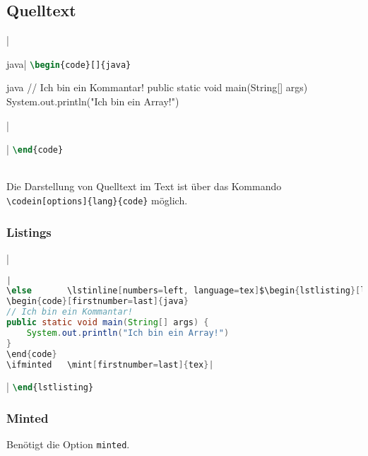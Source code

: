 \newpage
\subsection{Quelltext}
\begin{listing}
\ifminted   {}|\begin{code}[]{java}|    %
\else       \lstinline[numbers=left, language=tex]$\begin{code}[]{java}$\fi
\begin{code}[firstnumber=last]{java}
// Ich bin ein Kommantar!
public static void main(String[] args) {
    System.out.println("Ich bin ein Array!")
}
\end{code}
\ifminted   {}|\end{code}|    %
\else       \lstinline[firstnumber=last, numbers=left, language=tex]$\end{code}$\fi

\caption{Java Code}
\label{lst:java-code}
\end{listing}
~\\
Die Darstellung von Quelltext im Text ist über das Kommando \verb|\codein[options]{lang}{code}| möglich.

\subsubsection{Listings}
\begin{listing}
\ifminted   {}|\begin{lstlisting}[language=Java, caption=Java Lstlisting]|
\else       \lstinline[numbers=left, language=tex]$\begin{lstlisting}[language=Java, caption=Java Lstlisting]$\fi
\begin{code}[firstnumber=last]{java}
// Ich bin ein Kommantar!
public static void main(String[] args) {
    System.out.println("Ich bin ein Array!")
}
\end{code}
\ifminted   \mint[firstnumber=last]{tex}|\end{lstlisting}|
\else       \lstinline[firstnumber=last, numbers=left, language=tex]$\end{lstlisting}$\fi
\caption{Java Lstlisting}
\label{lst:java-lstlisting}
\end{listing}

\newpage
\subsubsection{Minted}
Benötigt die Option \texttt{minted}.
